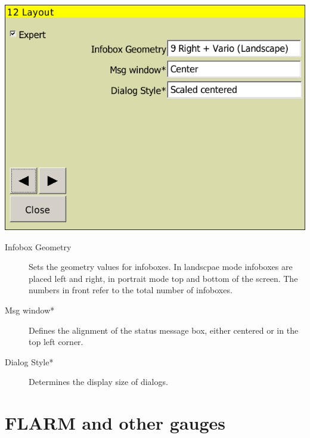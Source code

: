 \documentclass[a4paper,12pt]{refrep}
\begin{document}
\begin{center}
\includegraphics[angle=0,width=\linewidth,keepaspectratio='true']{figures/config-layout.png}
\end{center}

\begin{description}
\item[Infobox Geometry]  Sets the geometry values for infoboxes. In landscpae
mode infoboxes are placed left and right, in portrait mode top and bottom of the screen. The numbers in front refer 
to the total number of infoboxes.
\item[Msg window*]  Defines the alignment of the status message box, either
centered or in the top left corner.
\item[Dialog Style*]  Determines the display size of dialogs.
\end{description}


\clearpage
\section{FLARM and other gauges}\label{sec:vario-gauge}
\end{document}

